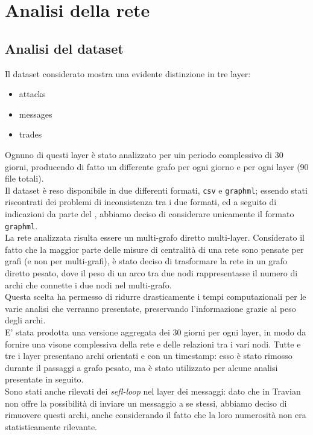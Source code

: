 \chapter{Analisi della rete}
\section{Analisi del dataset}
Il dataset considerato mostra una evidente distinzione in tre layer:
\begin{itemize}
	\item attacks
	\item messages
	\item trades
\end{itemize}
Ognuno di questi layer è stato analizzato per uin periodo complessivo di 30 giorni, producendo di fatto un differente grafo per ogni giorno e per ogni layer (90 file totali).\\
Il dataset è reso disponibile in due differenti formati, \texttt{csv} e \texttt{graphml}; essendo stati riscontrati dei problemi di inconsistenza tra i due formati, ed a seguito di indicazioni da parte del , abbiamo deciso di considerare unicamente il formato \texttt{graphml}.\\
La rete analizzata risulta essere un multi-grafo diretto multi-layer. Considerato il fatto che la maggior parte delle misure di centralità di una rete sono pensate per grafi (e non per multi-grafi), è stato deciso di trasformare la rete in un grafo diretto pesato, dove il peso di un arco tra due nodi rappresentasse il numero di archi che connette i due nodi nel multi-grafo.\\
Questa scelta ha permesso di ridurre drasticamente i tempi computazionali per le varie analisi che verranno presentate, preservando l'informazione grazie al peso degli archi.\\
E' stata prodotta una versione aggregata dei 30 giorni per ogni layer, in modo da fornire una visone complessiva della rete e delle relazioni tra i vari nodi.
Tutte e tre i layer presentano archi orientati e con un timestamp: esso è stato rimosso durante il passaggi a grafo pesato, ma è stato utilizzato per alcune analisi presentate in seguito.\\
Sono stati anche rilevati dei \textit{sefl-loop} nel layer dei messaggi: dato che in Travian non offre la possibilità di inviare un messaggio a se stessi, abbiamo deciso di rimuovere questi archi, anche considerando il fatto che la loro numerosità non era statisticamente rilevante.

